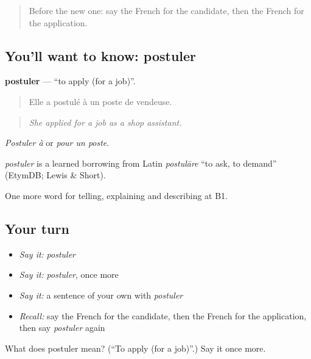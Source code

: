 \begin{quote}
Before the new one: say the French for the candidate, then the French for the application.
\end{quote}

\subsection*{You'll want to know: postuler}
\textbf{postuler} — \textquotedblleft{}to apply (for a job)\textquotedblright{}.

\begin{quote}
Elle a postulé à un poste de vendeuse.
\end{quote}

\begin{quote}
\emph{She applied for a job as a shop assistant.}
\end{quote}

\emph{Postuler à} or \emph{pour un poste}.

\begin{cousinweb}
\emph{postuler} is a learned borrowing from Latin \emph{postulāre} \textquotedblleft{}to ask, to demand\textquotedblright{} (EtymDB; Lewis \& Short).
\end{cousinweb}

\begin{grammarlens}[title={What you've built}]
One more word for telling, explaining and describing at B1.
\end{grammarlens}

\subsection*{Your turn}
\begin{itemize}
\raggedright
  \item \emph{Say it:} \emph{postuler}
  \item \emph{Say it:} \emph{postuler}, once more
  \item \emph{Say it:} a sentence of your own with \emph{postuler}
  \item \emph{Recall:} say the French for the candidate, then the French for the application, then say \emph{postuler} again
\end{itemize}

\begin{tcolorbox}[breakable,colback=teal!4,colframe=teal!35!black,title={Before you move on}]
What does postuler mean? (\textquotedblleft{}To apply (for a job)\textquotedblright{}.) Say it once more.
\end{tcolorbox}
